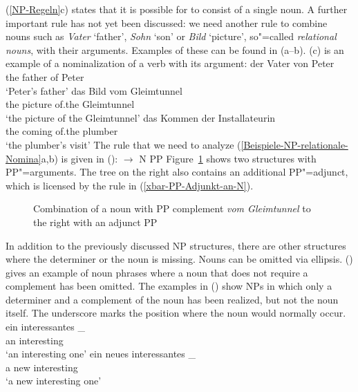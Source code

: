 (\ref{NP-Regeln}c) states that it is possible for \nbar to consist of a single noun. A further important rule has not yet been
discussed: we need another rule to combine nouns such as \emph{Vater} `father', \emph{Sohn} `son' or \emph{Bild} `picture', 
so"=called \emph{relational nouns}, with their arguments. Examples of these can be found in (a--b).
(c) is an example of a nominalization of a verb with its argument:
\eal
\label{Beispiele-NP-relationale-Nomina}
\ex 
\gll der Vater von Peter\\
	 the father of Peter\\
\glt `Peter's father'
\ex 
\gll das Bild vom Gleimtunnel\\
	 the picture of.the Gleimtunnel\\
\glt `the picture of the Gleimtunnel'
\ex 
\gll das Kommen der Installateurin\\
	 the coming of.the plumber\\
\glt `the plumber's visit'
\zl
\noindent
The rule that we need to analyze (\ref{Beispiele-NP-relationale-Nomina}a,b) is given in
():
\ea
\nbar $\to$ N PP
\z
%
Figure~\ref{Abbildung-NP-mit-PP-Argument} shows two structures with PP"=arguments. The tree on the right also contains an additional PP"=adjunct, which is licensed
by the rule in (\ref{xbar-PP-Adjunkt-an-N}).
\begin{figure}
\caption{\label{Abbildung-NP-mit-PP-Argument}Combination of a noun with PP complement
  \emph{vom Gleimtunnel} to the right with an adjunct PP}
\end{figure}%

\largerpage
In addition to the previously discussed NP structures, there are other structures where the
determiner or the noun is missing.
Nouns can be omitted via ellipsis. () gives an example of noun phrases where a noun that does not require a complement
has been omitted. The examples in () show NPs in which only a determiner and a complement of the noun has been realized,
but not the noun itself. The underscore marks the position where the noun would normally occur. 
\eal
\label{ex-nounless-np}
\ex 
\gll ein interessantes \_\\
     an  interesting\\
\glt `an interesting one'
\ex 
\gll ein neues interessantes \_\\
     a   new   interesting\\
\glt `a new interesting one'

